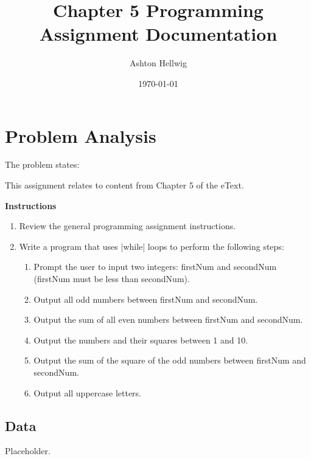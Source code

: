 \documentclass[a4paper, 11pt]{article}
\title{Chapter 5 Programming Assignment Documentation}
\author{Ashton Hellwig}
\date\today
\begin{document}
  \maketitle
  \tableofcontents
  \listofalgorithms
  \lstlistoflistings
  \listoffigures
  \newpage


  \section{Problem Analysis}
    The problem states:
    \begin{mdframed}[backgroundcolor=green!20]
      This assignment relates to content from Chapter 5 of the eText.

      \textbf{Instructions}\vspace{-8pt}
      \begin{enumerate}
        \item Review the general programming assignment instructions.
        \item%
          Write a program that uses |while| loops to perform the following
            steps:
            \begin{enumerate}[label=\alph*.]
              \item Prompt the user to input two integers: firstNum and
                secondNum (firstNum must be less than secondNum).
              \item Output all odd numbers between firstNum and secondNum.
              \item Output the sum of all even numbers between firstNum and
                secondNum.
              \item Output the numbers and their squares between 1 and 10.
              \item Output the sum of the square of the odd numbers between
                firstNum and secondNum.
              \item Output all uppercase letters.
            \end{enumerate}
      \end{enumerate}
    \end{mdframed}

    \subsection{Data}
      Placeholder.
\end{document}

